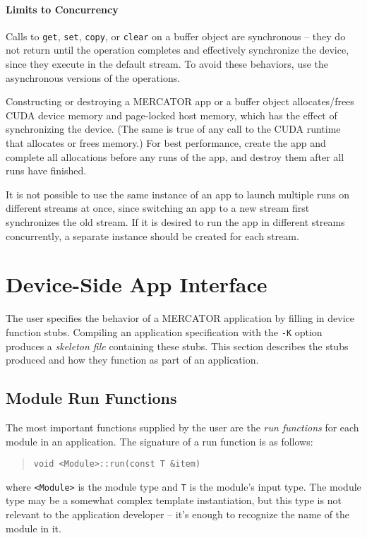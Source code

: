 \documentclass[11pt]{article}
\begin{document}
\paragraph*{Limits to Concurrency}

Calls to \texttt{get}, \texttt{set}, \texttt{copy}, or \texttt{clear}
on a buffer object are synchronous -- they do not return until the
operation completes and effectively synchronize the device, since they
execute in the default stream.  To avoid these behaviors, use the
asynchronous versions of the operations.
  
Constructing or destroying a MERCATOR app or a buffer object
allocates/frees CUDA device memory and page-locked host memory, which
has the effect of synchronizing the device.  (The same is true of any
call to the CUDA runtime that allocates or frees memory.) For best
performance, create the app and complete all allocations before any
runs of the app, and destroy them after all runs have finished.

It is not possible to use the same instance of an app to launch
multiple runs on different streams at once, since switching an app to
a new stream first synchronizes the old stream.  If it is desired to
run the app in different streams concurrently, a separate instance
should be created for each stream.

\newpage

\section{Device-Side App Interface}

The user specifies the behavior of a MERCATOR application by filling
in device function stubs.  Compiling an application specification with
the \texttt{-K} option produces a \textit{skeleton file} containing
these stubs.  This section describes the stubs produced and how they
function as part of an application.

\subsection{Module Run Functions}

The most important functions supplied by the user are the \textit{run
  functions} for each module in an application.  The signature of a
run function is as follows:
\begin{quote}
\texttt{void <Module>::run(const T \&item)}
\end{quote}
where \texttt{<Module>} is the module type and \texttt{T} is the
module's input type.  The module type may be a somewhat complex
template instantiation, but this type is not relevant to the
application developer -- it's enough to recognize the name of the
module in it.
\end{document}

